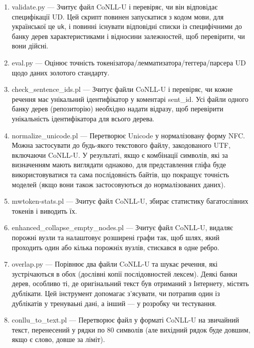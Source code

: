 \begin{enumerate}
  \item validate.py --- Зчитує файл CoNLL-U і перевіряє, чи він відповідає
  специфікації UD. Цей скрипт повинен запускатися з кодом мови, для 
  української це \texttt{uk}, і повинні існувати відповідні списки із
  специфічними до банку дерев характеристиками і відносини залежностей, щоб 
  перевірити, чи вони дійсні.
  
  \item eval.py --- Оцінює точність токенізатора/лемматизатора/теггера/парсера
  UD щодо даних золотого стандарту.
  
  \item check\_sentence\_ids.pl --- Зчитує файли CoNLL-U і перевіряє, чи кожне
  речення має унікальний ідентифікатор у коментарі sent\_id.
  Усі файли одного банку дерев (репозиторію) необхідно надати відразу, щоб
  перевірити унікальність ідентифікатора для всього дерева.
  
  \item normalize\_unicode.pl --- Перетворює Unicode у нормалізовану форму NFC.
  Можна застосувати до будь-якого текстового файлу, закодованого UTF,
  включаючи CoNLL-U. У результаті, якщо є комбінації символів, які за
  визначенням мають виглядати однаково, для представлення гліфа буде
  використовуватися та сама послідовність байтів, що покращує точність моделей
  (якщо вони також застосовуються до нормалізованих даних).
  
  \item mwtoken-stats.pl --- Зчитує файл CoNLL-U, збирає статистику багатослівних токенів і виводить їх.
  
  \item enhanced\_collapse\_empty\_nodes.pl --- Зчитує файл CoNLL-U, видаляє
  порожні вузли та налаштовує розширені графи так, щоб шлях, який проходить
  один або кілька порожніх вузлів, стискався в одне ребро.
  
  \item overlap.py --- Порівнює два файли CoNLL-U та шукає речення, які
  зустрічаються в обох (дослівні копії послідовностей лексем). Деякі банки
  дерев, особливо ті, де оригінальний текст був отриманий з Інтернету, містять
  дублікати. Цей інструмент допомагає з’ясувати, чи потрапив один із дублікатів у тренуваьні дані, а інший — у розробку чи тестування.
  
  \item conllu\_to\_text.pl --- Перетворює файл у форматі CoNLL-U на звичайний
  текст, перенесений у рядки по 80 символів 
  (але вихідний рядок буде довшим, якщо є слово, довше за ліміт).
  
\end{enumerate}

